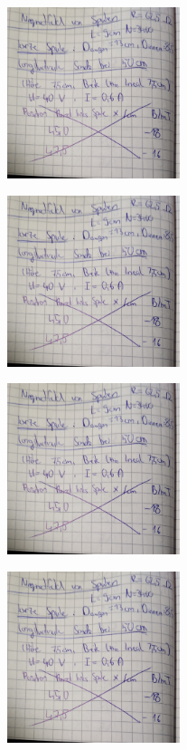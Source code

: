 \begin{minipage}[t]{0.4\textwidth}
    \includegraphics[height=5cm, page=3]{scans_messdaten/v308_lange_kurze_Spule.pdf}
\end{minipage}
\begin{minipage}[t]{0.4\textwidth}
    \includegraphics[height=5cm, page=4]{scans_messdaten/v308_lange_kurze_Spule.pdf}
\end{minipage}

\begin{minipage}[t]{0.4\textwidth}
    \includegraphics[height=5cm, page=5]{scans_messdaten/v308_lange_kurze_Spule.pdf}
\end{minipage}

\begin{minipage}[t]{0.4\textwidth}
    \includegraphics[height=5cm, page=6]{scans_messdaten/v308_lange_kurze_Spule.pdf}
\end{minipage}



